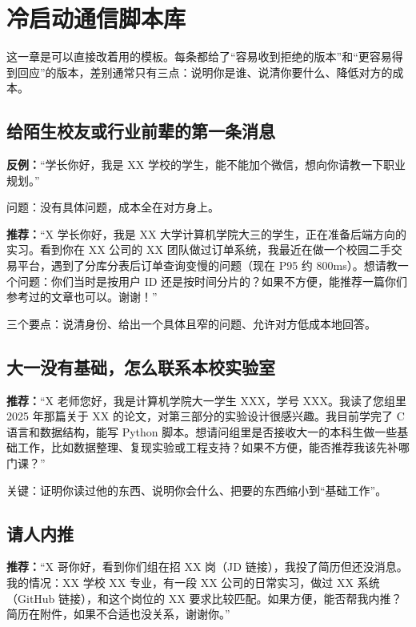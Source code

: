 \documentclass[UTF8,zihao=5,openany]{ctexbook}
\begin{document}
\chapter{冷启动通信脚本库}
这一章是可以直接改着用的模板。每条都给了“容易收到拒绝的版本”和“更容易得到回应”的版本，差别通常只有三点：说明你是谁、说清你要什么、降低对方的成本。

\section{给陌生校友或行业前辈的第一条消息}
\begin{casebox}
\textbf{反例：}“学长你好，我是 XX 学校的学生，能不能加个微信，想向你请教一下职业规划。”
\end{casebox}

问题：没有具体问题，成本全在对方身上。

\begin{casebox}
\textbf{推荐：}“X 学长你好，我是 XX 大学计算机学院大三的学生，正在准备后端方向的实习。看到你在 XX 公司的 XX 团队做过订单系统，我最近在做一个校园二手交易平台，遇到了分库分表后订单查询变慢的问题（现在 P95 约 800ms）。想请教一个问题：你们当时是按用户 ID 还是按时间分片的？如果不方便，能推荐一篇你们参考过的文章也可以。谢谢！”
\end{casebox}

三个要点：说清身份、给出一个具体且窄的问题、允许对方低成本地回答。

\section{大一没有基础，怎么联系本校实验室}
\begin{casebox}
\textbf{推荐：}“X 老师您好，我是计算机学院大一学生 XXX，学号 XXX。我读了您组里 2025 年那篇关于 XX 的论文，对第三部分的实验设计很感兴趣。我目前学完了 C 语言和数据结构，能写 Python 脚本。想请问组里是否接收大一的本科生做一些基础工作，比如数据整理、复现实验或工程支持？如果不方便，能否推荐我该先补哪门课？”
\end{casebox}

关键：证明你读过他的东西、说明你会什么、把要的东西缩小到“基础工作”。

\section{请人内推}
\begin{casebox}
\textbf{推荐：}“X 哥你好，看到你们组在招 XX 岗（JD 链接），我投了简历但还没消息。我的情况：XX 学校 XX 专业，有一段 XX 公司的日常实习，做过 XX 系统（GitHub 链接），和这个岗位的 XX 要求比较匹配。如果方便，能否帮我内推？简历在附件，如果不合适也没关系，谢谢你。”
\end{casebox}
\end{document}
